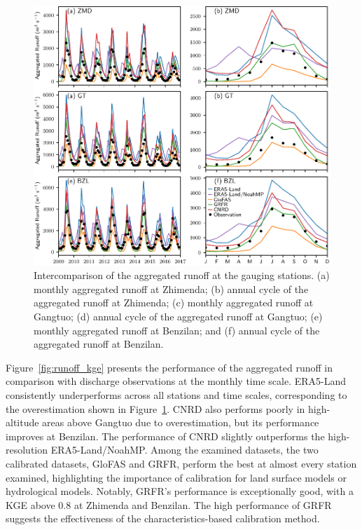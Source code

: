 \documentclass[preprint, review, authoryear, longtitle, 12pt, 3p]{elsarticle}
\begin{document}
\begin{figure}[ht!]
  \centering
  \includegraphics[width=\textwidth]{runoff_agg_ts.pdf}
  \caption{Intercomparison of the aggregated runoff at the gauging stations. (a) monthly aggregated runoff at Zhimenda; (b) annual cycle of the aggregated runoff at Zhimenda; (c) monthly aggregated runoff at Gangtuo; (d) annual cycle of the aggregated runoff at Gangtuo; (e) monthly aggregated runoff at Benzilan; and (f) annual cycle of the aggregated runoff at Benzilan.}
  \label{fig:runoff_agg_ts}
\end{figure}

Figure~\ref{fig:runoff_kge} presents the performance of the aggregated runoff in comparison with discharge observations at the monthly time scale. ERA5-Land consistently underperforms across all stations and time scales, corresponding to the overestimation shown in Figure~\ref{fig:runoff_agg_ts}. CNRD also performs poorly in high-altitude areas above Gangtuo due to overestimation, but its performance improves at Benzilan. The performance of CNRD slightly outperforms the high-resolution ERA5-Land/NoahMP. Among the examined datasets, the two calibrated datasets, GloFAS and GRFR, perform the best at almost every station examined, highlighting the importance of calibration for land surface models or hydrological models. Notably, GRFR's performance is exceptionally good, with a KGE above 0.8 at Zhimenda and Benzilan. The high performance of GRFR suggests the effectiveness of the characteristics-based calibration method.
\end{document}
